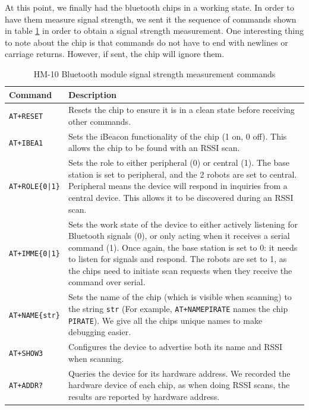 \documentclass[]{article}
\newcommand{\ra}[1]{\renewcommand{\arraystretch}{#1}}
\begin{document}

At this point, we finally had the bluetooth chips in a working state.
In order to have them measure signal strength, we sent it the sequence of commands
shown in table \ref{table:blecommands} in order to obtain a signal strength measurement.
One interesting thing to note about the chip is that commands do not have to end with newlines or carriage returns.
However, if sent, the chip will ignore them.

\begin{table}[]
\centering
\ra{1.3}
\caption{HM-10 Bluetooth module signal strength measurement commands}
\label{table:blecommands}
\begin{tabularx}{\textwidth}{@{}l X@{}}
\toprule
Command & Description \\ \midrule
\texttt{AT+RESET} & Resets the chip to ensure it is in a clean state
before receiving other commands. \\

\texttt{AT+IBEA1} & Sets the iBeacon functionality of the chip (1 on, 0 off).
This allows the chip to be found with an RSSI scan. \\

\texttt{AT+ROLE\{0|1\}} & Sets the role to either peripheral (0) or central (1).
The base station is set to peripheral, and the 2 robots are set to central.
Peripheral means the device will respond in inquiries from a central device.
This allows it to be discovered during an RSSI scan.\\

\texttt{AT+IMME\{0|1\}} & Sets the work state of the device to either actively
listening for Bluetooth signals (0), or only acting when it receives a serial
command (1). Once again, the base station is set to 0: it needs to listen for
signals and respond. The robots are set to 1, as the chips need to initiate scan
requests when they receive the command over serial. \\

\texttt{AT+NAME\{str\}} & Sets the name of the chip (which is visible when
scanning) to the string \texttt{str} (For example, \texttt{AT+NAMEPIRATE} names
the chip \texttt{PIRATE}). We give all the chips unique names to make
debugging easier. \\

\texttt{AT+SHOW3} & Configures the device to advertise both its name
and RSSI when scanning. \\

\texttt{AT+ADDR?} & Queries the device for its hardware address. We
recorded the hardware device of each chip, as when doing RSSI scans,
the results are reported by hardware address. \\


\end{tabularx}
\end{table}
\end{document}
